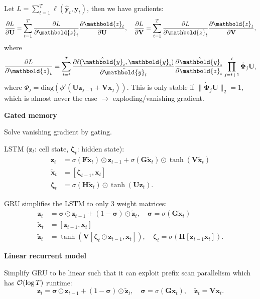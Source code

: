 \documentclass[10pt]{article}
\newenvironment{topic}[1]
{\textbf{\sffamily \footnotesize \colorbox{black}{\rlap{\textbf{\textcolor{white}{#1}}}\hspace{\linewidth}\hspace{-2\fboxsep}}}}
{}
\newenvironment{subtopic}[1]
{\vspace{0.1cm} \begin{center}\textbf{\footnotesize \sffamily #1}\end{center}}
{}
\renewcommand{\mat}[1]{\ensuremath{\mathbf{#1}}}
\renewcommand{\vec}[1]{\ensuremath{\mathbold{#1}}}
\begin{document}
\begin{multicols*}{3}
\begin{topic}{Recurrent neural networks}
        Let $L = \sum_{t=1}^{T} \ell(\hat{\vec{y}}_t, \vec{y}_t)$, then we have gradients: \[
            \pdv{L}{\mat{U}} = \sum_{t=1}^{T} \pdv{L}{\vec{z}_t} \pdv{\vec{z}_t}{\mat{U}}, \quad \pdv{L}{\mat{V}} = \sum_{t=1}^{T} \pdv{L}{\vec{z}_t} \pdv{\vec{z}_t}{\mat{V}},
        \]
        where \[
            \pdv{L}{\vec{z}_t} = \sum_{i=t}^{T} \pdv{\ell(\hat{\vec{y}}_i, \vec{y}_i)}{\hat{\vec{y}}_i} \pdv{\hat{\vec{y}}_i}{\vec{z}_i} \prod_{j=t+1}^i \dot{\mat{\Phi}}_j \mat{U},
        \]
        where $\dot{\Phi}_j = \mathrm{diag}(\phi'(\mat{U}\vec{z}_{j-1} + \mat{V}\vec{x}_j))$. This is only
        stable if $\| \dot{\mat{\Phi}}_j \mat{U} \|_2 = 1$, which is almost never the case $\to$
        exploding/vanishing gradient.

        \begin{subtopic}{Gated memory}
            Solve vanishing gradient by gating.

            LSTM ($\vec{z}_t$: cell state, $\vec{\zeta}_t$: hidden state):
            \begin{align*}
                \vec{z}_t         & = \sigma(\mat{F}\tilde{\vec{x}}_t) \odot \vec{z}_{t-1} + \sigma(\mat{G}\tilde{\vec{x}}_t) \odot \tanh(\mat{V}\tilde{\vec{x}}_t) \\
                \tilde{\vec{x}}_t & = [\vec{\zeta}_{t-1}, \vec{x}_t]                                                                                                \\
                \vec{\zeta}_t     & = \sigma(\mat{H}\tilde{\vec{x}}_t) \odot \tanh(\mat{U}\vec{z}_t).
            \end{align*}

            GRU simplifies the LSTM to only 3 weight matrices:
            \begin{align*}
                \vec{z}_t         & = \vec{\sigma} \odot \vec{z}_{t-1} + (1-\vec{\sigma}) \odot \tilde{\vec{z}}_t, \quad \vec{\sigma} = \sigma(\mat{G}\tilde{\vec{x}}_t) \\
                \tilde{\vec{x}}_t & = [\vec{z}_{t-1}, \vec{x}_t]                                                                                                         \\
                \tilde{\vec{z}}_t & = \tanh(\mat{V}[\vec{\zeta}_t \odot \vec{z}_{t-1}, \vec{x}_t]), \quad \vec{\zeta}_t = \sigma(\mat{H}[\vec{z}_{t-1} \vec{x}_t]).
            \end{align*}
        \end{subtopic}

        \begin{subtopic}{Linear recurrent model}
            Simplify GRU to be linear such that it can exploit prefix scan parallelism which has $\bigo{\log T}$ runtime: \[
                \vec{z}_t = \vec{\sigma} \odot \vec{z}_{t-1} + (1-\vec{\sigma}) \odot \tilde{\vec{z}}_t, \quad \vec{\sigma} = \sigma(\mat{G}\vec{x}_t), \quad \tilde{\vec{z}}_t = \mat{V}\vec{x}_t.
            \]


\end{subtopic}
\end{topic}
\end{multicols*}
\end{document}
